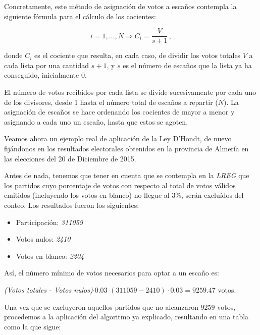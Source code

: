 \documentclass[11pt]{article}
\begin{document}
	Concretamente, este método de asignación de votos a escaños contempla la siguiente fórmula para el cálculo de los cocientes:
	
	$$i = 1,\ldots,N \Rightarrow C_i = \dfrac{V}{s + 1}\, ,$$
	
	donde $C_i$ es el cociente que resulta, en cada caso, de dividir los votos totales $V$ a cada lista por una cantidad $s + 1$, y $s$ es el número de escaños que la lista ya ha conseguido, inicialmente 0.
	
	El número de votos recibidos por cada lista se divide sucesivamente por cada uno de los divisores, desde 1 hasta el número total de escaños a repartir ($N$). La asignación de escaños se hace ordenando los cocientes de mayor a menor y asignando a cada uno un escaño, hasta que estos se agoten.
	
	Veamos ahora un ejemplo real de aplicación de la Ley D'Hondt, de nuevo fijándonos en los resultados electorales obtenidos en la provincia de Almería en las elecciones del 20 de Diciembre de 2015.
	
	Antes de nada, tenemos que tener en cuenta que se contempla en la \textit{LREG} que los partidos cuyo porcentaje de votos con respecto al total de votos válidos emitidos (incluyendo los votos en blanco) no llegue al 3\%, serán excluídos del conteo. Los resultados fueron los siguientes:
	
	\begin{itemize}
	\item Participación: \textit{311059}
	\item Votos nulos: \textit{2410}
	\item Votos en blanco: \textit{2204} 
	\end{itemize}
	
	Así, el número mínimo de votos necesarios para optar a un escaño es:
	\begin{center}
	 \textit{(Votos totales - Votos nulos)$\cdot 0.03$} $(311059 - 2410)\cdot 0.03 = 9259.47$ votos.
	\end{center}
	
	Una vez que se excluyeron aquellos partidos que no alcanzaron $9259$ votos, procedemos a la aplicación del algoritmo ya explicado, resultando en una tabla como la que sigue:
	
\end{document}

